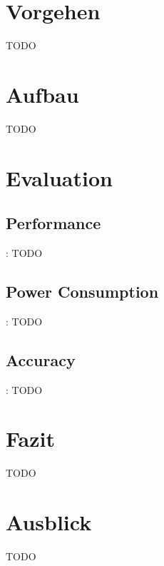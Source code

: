 \documentclass{beamer}
\begin{document}
\section{Vorgehen}
\begin{frame}{\secname}
TODO    
\end{frame}

\section{Aufbau}
\begin{frame}{\secname}
TODO    
\end{frame}

\section{Evaluation}
\subsection{Performance}
\begin{frame}{\secname: \subsecname}
TODO
\end{frame}

\subsection{Power Consumption}
\begin{frame}{\secname: \subsecname}
TODO
\end{frame}

\subsection{Accuracy}
\begin{frame}{\secname: \subsecname}
TODO
\end{frame}

\section{Fazit}
\begin{frame}{\secname}
TODO    
\end{frame}

\section{Ausblick}
\begin{frame}{\secname}
TODO
\end{frame}
\end{document}
